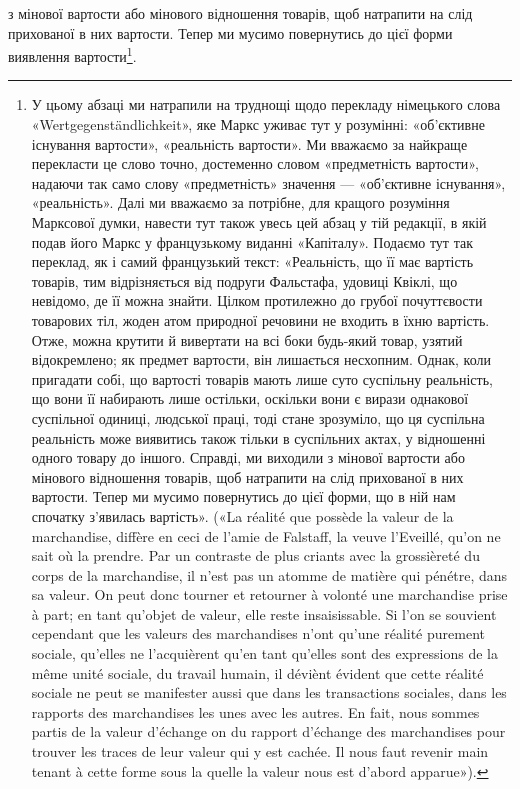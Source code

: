 \parcont{}  %
з мінової вартости або мінового відношення товарів, щоб натрапити
на слід прихованої в них вартости. Тепер ми мусимо повернутись
до цієї форми виявлення вартости\footnote*{
У цьому абзаці ми натрапили на труднощі щодо перекладу німецького
слова «\textgerman{Wertgegenständlichkeit}», яке Маркс уживає тут у розумінні:
«об’єктивне існування вартости», «реальність вартости». Ми
вважаємо за найкраще перекласти це слово точно, достеменно словом
«предметність вартости», надаючи так само слову «предметність» значення
— «об’єктивне існування», «реальність». Далі ми вважаємо за
потрібне, для кращого розуміння Марксової думки, навести тут також
увесь цей абзац у тій редакції, в якій подав його Маркс у французькому
виданні «Капіталу». Подаємо тут так переклад, як і самий французький
текст: «Реальність, що її має вартість товарів, тим відрізняється від
подруги Фальстафа, удовиці Квіклі, що невідомо, де її можна знайти.
Цілком протилежно до грубої почуттєвости товарових тіл, жоден атом
природної речовини не входить в їхню вартість. Отже, можна крутити й
вивертати на всі боки будь-який товар, узятий відокремлено; як предмет
вартости, він лишається несхопним. Однак, коли пригадати собі, що
вартості товарів мають лише суто суспільну реальність, що вони її набирають
лише остільки, оскільки вони є вирази однакової суспільної одиниці,
людської праці, тоді стане зрозуміло, що ця суспільна реальність
може виявитись також тільки в суспільних актах, у відношенні одного
товару до іншого. Справді, ми виходили з мінової вартости або мінового
відношення товарів, щоб натрапити на слід прихованої в них вартости.
Тепер ми мусимо повернутись до цієї форми, що в ній нам спочатку з’явилась
вартість». («La réalité que possède la valeur de la marchandise, diffère
en ceci de l’amie de Falstaff, la veuve l’Eveillé, qu’on ne sait où la prendre.
Par un contraste de plus criants avec la grossièreté du corps de la marchandise,
il n’est pas un atomme de matière qui pénétre, dans sa valeur. On peut
donc tourner et retourner à volonté une marchandise prise à part; en tant
qu’objet de valeur, elle reste insaisissable. Si l’on se souvient cependant
que les valeurs des marchandises n’ont qu’une réalité purement sociale,
qu’elles ne l’acquièrent qu’en tant qu’elles sont des expressions de la même
unité sociale, du travail humain, il déviènt évident que cette réalité sociale
ne peut se manifester aussi que dans les transactions sociales, dans les
rapports des marchandises les unes avec les autres. En fait, nous sommes
partis de la valeur d’échange on du rapport d’échange des marchandises
pour trouver les traces de leur valeur qui y est cachée. Il nous faut revenir
main tenant à cette forme sous la quelle la valeur nous est d’abord
apparue»). \Red{}
}.


